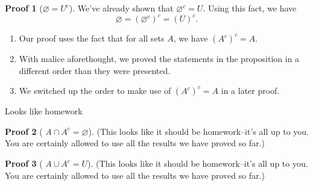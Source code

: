 \documentclass[fleqn]{beamer}
\theoremstyle{definition}
\newtheorem{myproof}{Proof}[]
\newenvironment{checklist}{
  \begin{enumerate}[\ding{51}]
    \addtolength{\itemsep}{-0.0\itemsep}}
  {\end{enumerate}}
\begin{document}
\begin{frame}

\begin{myproof}[\(  \varnothing  = U^c\)]
We've already shown that \(\varnothing^c = U\).  Using this fact, we have
\[
  \varnothing = (\varnothing^c)^c  = (U)^c.
\]
\end{myproof}

\begin{checklist}

\item Our proof uses the fact that for all sets \(A\), we have \((A^c)^c = A\).
\vspace{0.2in}
\item With malice aforethought, we proved the statements in the proposition in a different order than they were presented.

\vspace{0.2in}
\item  We switched up the order to make use of \((A^c)^c = A\) in a later proof.
\end{checklist}
\end{frame}

\begin{frame}{Looks like homework}


\begin{myproof}[  \(A \cap A^c = \varnothing\)]

(This looks like it should be homework--it's all up to you. You are certainly allowed to use all the results we have proved so far.)
\end{myproof}

\vspace{0.2in}

\begin{myproof}[  \(A \cup A^c = U \)]
(This looks like it should be homework--it's all up to you. You are certainly allowed to use all the results we have proved so far.)
\end{myproof}
\end{frame}
\end{document}
